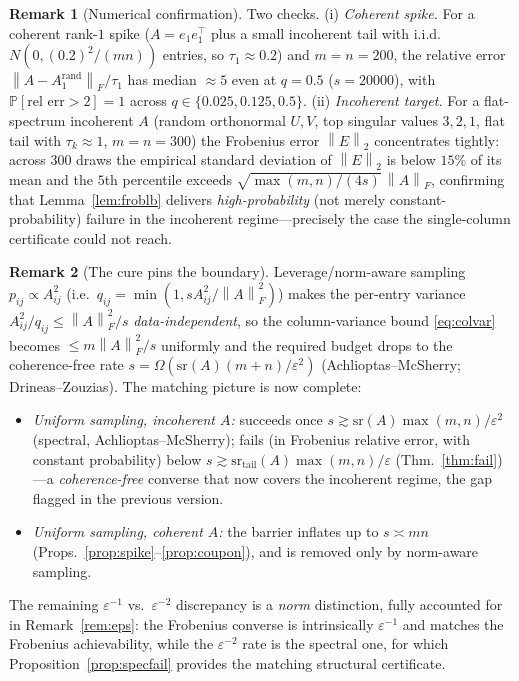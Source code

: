 \documentclass{amsart}
\theoremstyle{definition}
\newtheorem{remark}{Remark}
\newcommand{\Frob}[1]{\left\lVert #1\right\rVert_F}
\newcommand{\Op}[1]{\left\lVert #1\right\rVert_2}
\newcommand{\Prob}{\mathbb{P}}
\begin{document}
\begin{remark}[Numerical confirmation]\label{rem:numfail}
Two checks. (i) \emph{Coherent spike.} For a coherent rank-$1$ spike
($A=e_1e_1^\top$ plus a small incoherent tail with i.i.d.\ $N(0,(0.2)^2/(mn))$
entries, so $\tau_1\approx0.2$) and $m=n=200$, the relative error
$\Frob{A-A_1^{\mathrm{rand}}}/\tau_1$ has median $\approx5$ even at $q=0.5$
($s=20000$), with $\Prob[\text{rel err}>2]=1$ across $q\in\{0.025,0.125,0.5\}$.
(ii) \emph{Incoherent target.} For a flat-spectrum incoherent $A$ (random
orthonormal $U,V$, top singular values $3,2,1$, flat tail with $\tau_k\approx1$,
$m=n=300$) the Frobenius error $\Op E$ concentrates tightly: across $300$ draws
the empirical standard deviation of $\Op E$ is below $15\%$ of its mean and the
$5$th percentile exceeds $\sqrt{\max(m,n)/(4s)}\,\Frob A$, confirming that
Lemma~\ref{lem:froblb} delivers \emph{high-probability} (not merely
constant-probability) failure in the incoherent regime---precisely the case the
single-column certificate could not reach.
\end{remark}

\begin{remark}[The cure pins the boundary]\label{rem:cure}
Leverage/norm-aware sampling $p_{ij}\propto A_{ij}^2$ (i.e.\
$q_{ij}=\min(1,s A_{ij}^2/\Frob A^2)$) makes the per-entry variance
$A_{ij}^2/q_{ij}\le\Frob A^2/s$ \emph{data-independent}, so the column-variance
bound \eqref{eq:colvar} becomes $\le m\Frob A^2/s$ uniformly and the required
budget drops to the coherence-free rate
$s=\Omega(\mathrm{sr}(A)(m+n)/\varepsilon^2)$ (Achlioptas--McSherry;
Drineas--Zouzias). The matching picture is now complete:
\begin{itemize}
\item \emph{Uniform sampling, incoherent $A$:} succeeds once
$s\gtrsim\mathrm{sr}(A)\max(m,n)/\varepsilon^2$ (spectral, Achlioptas--McSherry);
fails (in Frobenius relative error, with constant probability) below
$s\gtrsim\mathrm{sr}_{\mathrm{tail}}(A)\max(m,n)/\varepsilon$
(Thm.~\ref{thm:fail})---a \emph{coherence-free} converse that now covers the
incoherent regime, the gap flagged in the previous version.
\item \emph{Uniform sampling, coherent $A$:} the barrier inflates up to
$s\asymp mn$ (Props.~\ref{prop:spike}--\ref{prop:coupon}), and is removed only by
norm-aware sampling.
\end{itemize}
The remaining $\varepsilon^{-1}$ vs.\ $\varepsilon^{-2}$ discrepancy is a
\emph{norm} distinction, fully accounted for in Remark~\ref{rem:eps}: the
Frobenius converse is intrinsically $\varepsilon^{-1}$ and matches the Frobenius
achievability, while the $\varepsilon^{-2}$ rate is the spectral one, for which
Proposition~\ref{prop:specfail} provides the matching structural certificate.
\end{remark}
\end{document}
